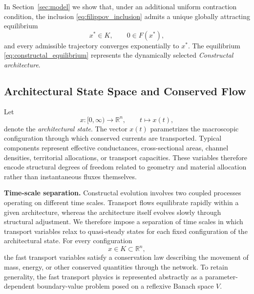 \documentclass[12pt]{article}
\theoremstyle{plain}
\theoremstyle{definition}
\theoremstyle{remark}
\begin{document}
In Section~\ref{sec:model} we show that, under an additional uniform
contraction condition, the inclusion
\eqref{eq:filippov_inclusion}
admits a unique globally attracting equilibrium
\begin{equation}
x^\ast\in K,
\qquad
0\in F(x^\ast),
\label{eq:constructal_equilibrium}
\end{equation}
and every admissible trajectory converges exponentially to $x^\ast$.
The equilibrium \eqref{eq:constructal_equilibrium} represents the
dynamically selected \emph{Constructal architecture}.

\subsection{Architectural State Space and Conserved Flow}
\label{subsec:state_space}

Let
\begin{equation}
x:[0,\infty)\to \mathbb{R}^n,
\qquad t\mapsto x(t),
\label{eq:architectural_state}
\end{equation}
denote the \emph{architectural state}.
The vector $x(t)$ parametrizes the macroscopic configuration
through which conserved currents are transported.
Typical components represent effective conductances,
cross-sectional areas, channel densities,
territorial allocations, or transport capacities.
These variables therefore encode structural degrees of freedom
related to geometry and material allocation rather than
instantaneous fluxes themselves.

\medskip

\noindent
\textbf{Time-scale separation.} Constructal evolution involves two coupled processes operating on
different time scales.
Transport flows equilibrate rapidly within a given architecture,
whereas the architecture itself evolves slowly through structural
adjustment.
We therefore impose a separation of time scales in which
transport variables relax to quasi-steady states for each fixed
configuration of the architectural state. For every configuration
\begin{equation}
x\in K\subset\mathbb{R}^n,
\label{eq:config_space}
\end{equation}
the fast transport variables satisfy a conservation law describing
the movement of mass, energy, or other conserved quantities through
the network.
To retain generality, the fast transport physics is represented
abstractly as a parameter-dependent boundary-value problem posed on a
reflexive Banach space $V$.
\end{document}
